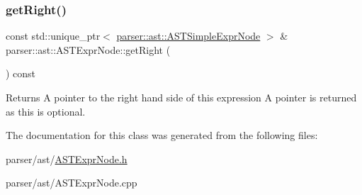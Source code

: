 \subsubsection{\texorpdfstring{get\+Right()}{getRight()}}
{\footnotesize\ttfamily const std\+::unique\+\_\+ptr$<$ \hyperlink{classparser_1_1ast_1_1ASTSimpleExprNode}{parser\+::ast\+::\+A\+S\+T\+Simple\+Expr\+Node} $>$ \& parser\+::ast\+::\+A\+S\+T\+Expr\+Node\+::get\+Right (\begin{DoxyParamCaption}{ }\end{DoxyParamCaption}) const}

\begin{DoxyReturn}{Returns}
A pointer to the right hand side of this expression A pointer is returned as this is optional. 
\end{DoxyReturn}


The documentation for this class was generated from the following files\+:\begin{DoxyCompactItemize}
\item 
parser/ast/\hyperlink{ASTExprNode_8h}{A\+S\+T\+Expr\+Node.\+h}\item 
parser/ast/A\+S\+T\+Expr\+Node.\+cpp\end{DoxyCompactItemize}
